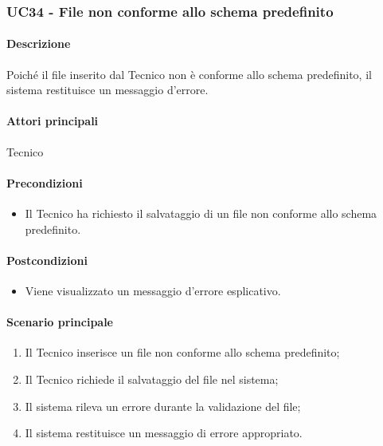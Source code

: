 \subsubsection{UC34 - File non conforme allo schema predefinito}\label{UC34}
\paragraph*{Descrizione}
Poiché il file inserito dal Tecnico non è conforme allo schema predefinito, il sistema restituisce un messaggio d'errore.

\paragraph*{Attori principali}
Tecnico

\paragraph*{Precondizioni}
\begin{itemize}
  \item Il Tecnico ha richiesto il salvataggio di un file non conforme allo schema predefinito.
\end{itemize}

\paragraph*{Postcondizioni}
\begin{itemize}
  \item Viene visualizzato un messaggio d'errore esplicativo.
\end{itemize}

\paragraph*{Scenario principale}
\begin{enumerate}
  \item Il Tecnico inserisce un file non conforme allo schema predefinito;
  \item Il Tecnico richiede il salvataggio del file nel sistema;
  \item Il sistema rileva un errore durante la validazione del file;
  \item Il sistema restituisce un messaggio di errore appropriato.
\end{enumerate}
